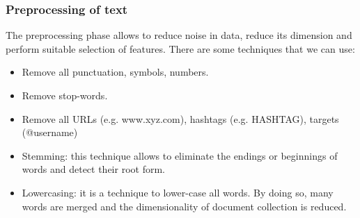 \documentclass[preprint,12pt]{elsarticle}
\begin{document}
\subsubsection{\textbf{Preprocessing of text}}
The preprocessing phase allows to reduce noise in data, reduce its dimension and perform suitable selection of features. There are some techniques that we can use:\\
\begin{itemize}
\item Remove all punctuation, symbols, numbers.
\item Remove stop-words.
\item Remove all URLs (e.g. www.xyz.com), hashtags (e.g. HASHTAG), targets (@username)
\item Stemming: this technique allows to eliminate the endings or beginnings of words and detect their root form.
\item Lowercasing: it is a technique to lower-case all words. By doing so, many words are merged and the dimensionality of document collection is reduced.
\end{itemize}
\end{document}
